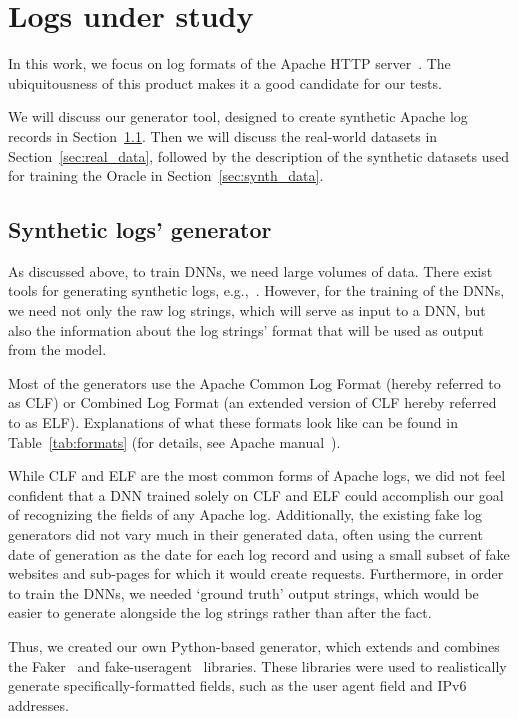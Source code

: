 \documentclass{article}
\begin{document}
\section{Logs under study} \label{sec:data}
In this work, we focus on log formats of the  Apache HTTP server~\cite{apachemodlog:online}. The ubiquitousness of this product makes it a good candidate for our tests.

We will discuss our generator tool, designed to create synthetic Apache log records in Section~\ref{sec:generator}. Then we will discuss the real-world datasets in Section~\ref{sec:real_data}, followed by the description of the synthetic datasets used for training the Oracle in Section~\ref{sec:synth_data}.  

\subsection{Synthetic logs' generator} \label{sec:generator}
As discussed above, to train DNNs, we need large volumes of data. There exist tools for generating synthetic logs, e.g.,~\cite{faker:online,kiritbas44:online}. However, for the training of the DNNs, we need not only the raw log strings, which will serve as input to a DNN, but also the information about the log strings' format that will be used as output from the model. 

Most of the generators use the Apache Common Log Format (hereby referred to as CLF) or Combined Log Format (an extended version of CLF hereby referred to as ELF). Explanations of what these formats look like can be found in Table~\ref{tab:formats} (for details, see Apache manual~\cite{apachecombinedlogformat:online}).

While CLF and ELF are the most common forms of Apache logs, we did not feel confident that a DNN trained solely on CLF and ELF could accomplish our goal of recognizing the fields of any Apache log. Additionally, the existing fake log generators did not vary much in their generated data, often using the current date of generation as the date for each log record and using a small subset of fake websites and sub-pages for which it would create requests. Furthermore, in order to train the DNNs, we needed `ground truth' output strings, which would be easier to generate alongside the log strings rather than after the fact.

Thus, we created our own Python-based generator, which extends and combines the Faker~\cite{faker:online} and fake-useragent~\cite{fakeuser:online} libraries. These libraries were used to realistically generate specifically-formatted fields, such as the user agent field and IPv6 addresses. 
\end{document}
